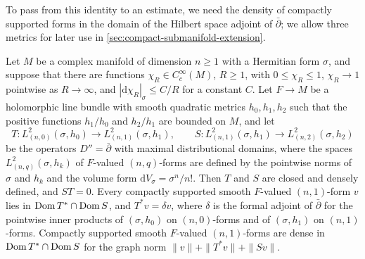 To pass from this identity to an estimate, we need the density of compactly supported forms in the domain of the Hilbert space adjoint of $\bar\partial$; we allow three metrics for later use in \cref{sec:compact-submanifold-extension}.

\begin{lemma}\label{lem:cutoff-mollifier-density}
Let $M$ be a complex manifold of dimension $n\geq1$ with a Hermitian form $\sigma$, and suppose that there are functions $\chi_R\in C^\infty_c(M)$, $R\geq1$, with $0\leq\chi_R\leq1$, $\chi_R\to1$ pointwise as $R\to\infty$, and $|\mathrm d\chi_R|_\sigma\leq C/R$ for a constant $C$. Let $F\to M$ be a holomorphic line bundle with smooth quadratic metrics $h_0,h_1,h_2$ such that the positive functions $h_1/h_0$ and $h_2/h_1$ are bounded on $M$, and let
\[
 T\colon L^2_{(n,0)}(\sigma,h_0)\to L^2_{(n,1)}(\sigma,h_1),\qquad
 S\colon L^2_{(n,1)}(\sigma,h_1)\to L^2_{(n,2)}(\sigma,h_2)
\]
be the operators $D''=\bar\partial$ with maximal distributional domains, where the spaces $L^2_{(n,q)}(\sigma,h_k)$ of $F$-valued $(n,q)$-forms are defined by the pointwise norms of $\sigma$ and $h_k$ and the volume form $\mathrm dV_\sigma=\sigma^n/n!$. Then $T$ and $S$ are closed and densely defined, and $ST=0$. Every compactly supported smooth $F$-valued $(n,1)$-form $v$ lies in $\operatorname{Dom} T^*\cap\operatorname{Dom} S$, and $T^*v=\delta v$, where $\delta$ is the formal adjoint of $\bar\partial$ for the pointwise inner products of $(\sigma,h_0)$ on $(n,0)$-forms and of $(\sigma,h_1)$ on $(n,1)$-forms. Compactly supported smooth $F$-valued $(n,1)$-forms are dense in $\operatorname{Dom} T^*\cap\operatorname{Dom} S$ for the graph norm $\|v\|+\|T^*v\|+\|Sv\|$.
\end{lemma}
